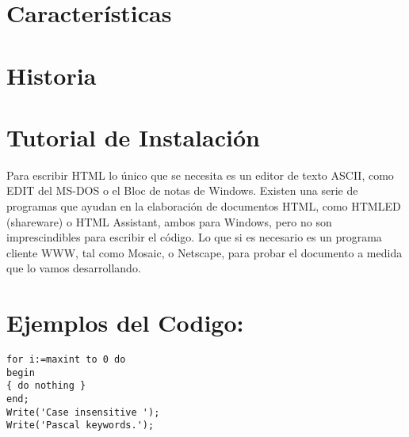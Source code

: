 \documentclass[11pt]{article} %
\begin{document}
\section{Características}
\section{Historia}
\section{Tutorial de Instalación}
Para escribir HTML lo único que se necesita es un editor de texto ASCII, como EDIT del MS-DOS o el Bloc de notas de Windows. \singlespace
\thinspace Existen una serie de programas que ayudan en la elaboración de documentos HTML, como HTMLED (shareware) o HTML Assistant, ambos para Windows, pero no son imprescindibles para escribir el código. Lo que si es necesario es un programa cliente WWW, tal como Mosaic, o Netscape, para probar el documento a medida que lo vamos desarrollando.

\section{Ejemplos del Codigo:}

\lstset{language=Pascal}          %

\begin{lstlisting}[frame=single]  % Start your code-block
for i:=maxint to 0 do
begin
{ do nothing }
end;
Write('Case insensitive ');
Write('Pascal keywords.');
\end{lstlisting}
\end{document}
